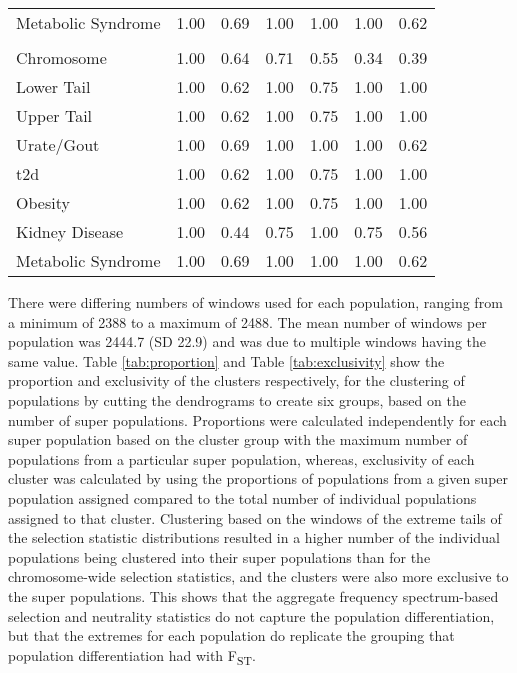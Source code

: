 \documentclass[]{report}
\begin{document}
\begin{table}
\begin{tabular}[t]{lllllll}
\hspace{1em}Metabolic Syndrome & 1.00 & 0.69 & 1.00 & 1.00 & 1.00 & \vphantom{1} 0.62\\
\addlinespace[0.3em]
\multicolumn{7}{l}{\textbf{Zeng's E}}\\
\hspace{1em}Chromosome & 1.00 & 0.64 & 0.71 & 0.55 & 0.34 & 0.39\\
\hspace{1em}Lower Tail & 1.00 & 0.62 & 1.00 & 0.75 & 1.00 & 1.00\\
\hspace{1em}Upper Tail & 1.00 & 0.62 & 1.00 & 0.75 & 1.00 & 1.00\\
\hspace{1em}Urate/Gout & 1.00 & 0.69 & 1.00 & 1.00 & 1.00 & 0.62\\
\hspace{1em}\Gls{t2d} & 1.00 & 0.62 & 1.00 & 0.75 & 1.00 & 1.00\\
\hspace{1em}Obesity & 1.00 & 0.62 & 1.00 & 0.75 & 1.00 & 1.00\\
\hspace{1em}Kidney Disease & 1.00 & 0.44 & 0.75 & 1.00 & 0.75 & 0.56\\
\hspace{1em}Metabolic Syndrome & 1.00 & 0.69 & 1.00 & 1.00 & 1.00 & 0.62\\
\bottomrule
\end{tabular}
\end{table}

There were differing numbers of windows used for each population,
ranging from a minimum of 2388 to a maximum of 2488. The mean number of
windows per population was 2444.7 (SD 22.9) and was due to multiple
windows having the same value. Table \ref{tab:proportion} and Table
\ref{tab:exclusivity} show the proportion and exclusivity of the
clusters respectively, for the clustering of populations by cutting the
dendrograms to create six groups, based on the number of super
populations. Proportions were calculated independently for each super
population based on the cluster group with the maximum number of
populations from a particular super population, whereas, exclusivity of
each cluster was calculated by using the proportions of populations from
a given super population assigned compared to the total number of
individual populations assigned to that cluster. Clustering based on the
windows of the extreme tails of the selection statistic distributions
resulted in a higher number of the individual populations being
clustered into their super populations than for the chromosome-wide
selection statistics, and the clusters were also more exclusive to the
super populations. This shows that the aggregate frequency
spectrum-based selection and neutrality statistics do not capture the
population differentiation, but that the extremes for each population do
replicate the grouping that population differentiation had with
F\textsubscript{ST}.
\end{document}

